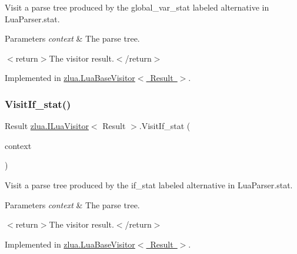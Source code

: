 Visit a parse tree produced by the {\ttfamily global\+\_\+var\+\_\+stat} labeled alternative in Lua\+Parser.\+stat. 


\begin{DoxyParams}{Parameters}
{\em context} & The parse tree.\\
\hline
\end{DoxyParams}
$<$return$>$The visitor result.$<$/return$>$ 

Implemented in \mbox{\hyperlink{classzlua_1_1_lua_base_visitor_a0801068996633dcc16867ec54b05a314}{zlua.\+Lua\+Base\+Visitor$<$ Result $>$}}.

\mbox{\label{interfacezlua_1_1_i_lua_visitor_a67ff0fb78fe2f6c915b5f218f57323b3}} 
\subsubsection{\texorpdfstring{Visit\+If\+\_\+stat()}{VisitIf\_stat()}}
{\footnotesize\ttfamily Result \mbox{\hyperlink{interfacezlua_1_1_i_lua_visitor}{zlua.\+I\+Lua\+Visitor}}$<$ Result $>$.Visit\+If\+\_\+stat (\begin{DoxyParamCaption}\item[{\mbox{[}\+Not\+Null\mbox{]} \mbox{\hyperlink{classzlua_1_1_lua_parser_1_1_if__stat_context}{Lua\+Parser.\+If\+\_\+stat\+Context}}}]{context }\end{DoxyParamCaption})}



Visit a parse tree produced by the {\ttfamily if\+\_\+stat} labeled alternative in Lua\+Parser.\+stat. 


\begin{DoxyParams}{Parameters}
{\em context} & The parse tree.\\
\hline
\end{DoxyParams}
$<$return$>$The visitor result.$<$/return$>$ 

Implemented in \mbox{\hyperlink{classzlua_1_1_lua_base_visitor_a1e7d3f1f74effce653280aaffa193128}{zlua.\+Lua\+Base\+Visitor$<$ Result $>$}}.

\mbox{\label{interfacezlua_1_1_i_lua_visitor_ac5b8231ca7341838cf864725ea880083}} 
